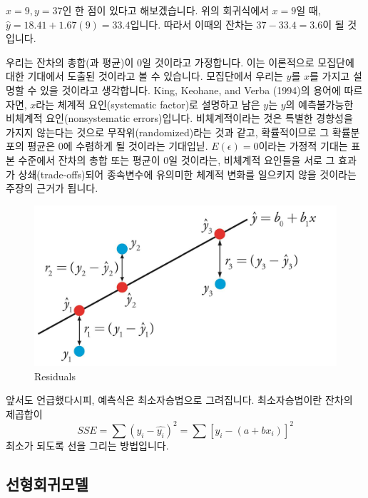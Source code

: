\documentclass[]{book}
\begin{document}
\(x = 9, y = 37\)인 한 점이 있다고 해보겠습니다. 위의 회귀식에서 \(x = 9\)일 때, \(\hat{y}= 18.41 + 1.67(9) = 33.4\)입니다. 따라서 이때의 잔차는 \(37 - 33.4 = 3.6\)이 될 것입니다.

우리는 잔차의 총합(과 평균)이 0일 것이라고 가정합니다. 이는 이론적으로 모집단에 대한 기대에서 도출된 것이라고 볼 수 있습니다. 모집단에서 우리는 \(y\)를 \(x\)를 가지고 설명할 수 있을 것이라고 생각합니다. King, Keohane, and Verba (1994)의 용어에 따르자면, \(x\)라는 체계적 요인(systematic factor)로 설명하고 남은 \(y\)는 \(y\)의 예측불가능한 비체계적 요인(nonsystematic errors)입니다. 비체계적이라는 것은 특별한 경향성을 가지지 않는다는 것으로 무작위(randomized)라는 것과 같고, 확률적이므로 그 확률분포의 평균은 0에 수렴하게 될 것이라는 기대입닏. \(E(\epsilon) = 0\)이라는 가정적 기대는 표본 수준에서 잔차의 총합 또는 평균이 0일 것이라는, 비체계적 요인들을 서로 그 효과가 상쇄(trade-offs)되어 종속변수에 유의미한 체계적 변화를 일으키지 않을 것이라는 주장의 근거가 됩니다.

\begin{figure}

{\centering \includegraphics[width=10.84in]{./Chapters_pdfR/plot/residulas} 

}

\caption{Residuals}\label{fig:unnamed-chunk-215}
\end{figure}

앞서도 언급했다시피, 예측식은 최소자승법으로 그려집니다. 최소자승법이란 잔차의 제곱합이 \[SSE = \sum(y_i - \hat{y_i})^2 = \sum[y_i - (a+bx_i)]^2\] 최소가 되도록 선을 그리는 방법입니다.

\hypertarget{uxc120uxd615uxd68cuxadc0uxbaa8uxb378}{%
\subsection{선형회귀모델}\label{uxc120uxd615uxd68cuxadc0uxbaa8uxb378}}
\end{document}

